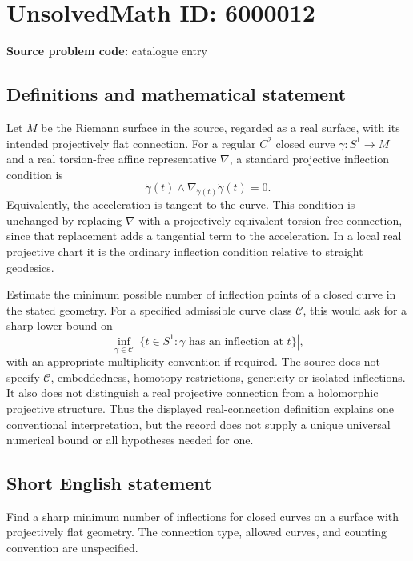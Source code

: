 \documentclass[11pt]{article}
\begin{document}
\section*{UnsolvedMath ID: 6000012}
\textbf{Source problem code:} catalogue entry
\subsection{Definitions and mathematical statement}
Let $M$ be the Riemann surface in the source, regarded as a real surface, with its intended projectively flat connection. For a regular $C^2$ closed curve $\gamma:S^1\to M$ and a real torsion-free affine representative $\nabla$, a standard projective inflection condition is
\[
\dot\gamma(t)\wedge\nabla_{\dot\gamma(t)}\dot\gamma(t)=0.
\]
Equivalently, the acceleration is tangent to the curve. This condition is unchanged by replacing $\nabla$ with a projectively equivalent torsion-free connection, since that replacement adds a tangential term to the acceleration. In a local real projective chart it is the ordinary inflection condition relative to straight geodesics.

Estimate the minimum possible number of inflection points of a closed curve in the stated geometry. For a specified admissible curve class $\mathcal C$, this would ask for a sharp lower bound on
\[
\inf_{\gamma\in\mathcal C}|\{t\in S^1:\gamma\text{ has an inflection at }t\}|,
\]
with an appropriate multiplicity convention if required. The source does not specify $\mathcal C$, embeddedness, homotopy restrictions, genericity or isolated inflections. It also does not distinguish a real projective connection from a holomorphic projective structure. Thus the displayed real-connection definition explains one conventional interpretation, but the record does not supply a unique universal numerical bound or all hypotheses needed for one.
\subsection{Short English statement}
Find a sharp minimum number of inflections for closed curves on a surface with projectively flat geometry. The connection type, allowed curves, and counting convention are unspecified.
\end{document}
